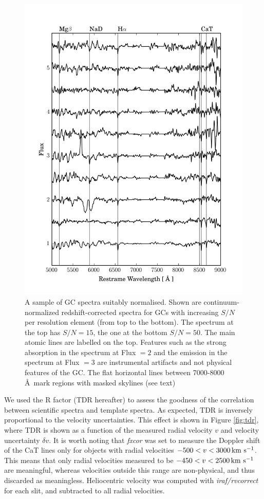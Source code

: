 \documentclass[useAMS,usenatbib]{mn2e}
\newcommand{\kms}{\mbox{\,km~s$^{-1}$}}
\begin{document}
\begin{figure}
\centering
\includegraphics[width=\columnwidth]{figures/vstack_spectra.png} 
\caption{A sample of GC spectra suitably normalised. Shown are 
continuum-normalized redshift-corrected spectra for GCs with increasing $S/N$ per resolution element
(from top to the bottom). The spectrum at the top has $S/N = 15$, 
the one at the bottom $S/N = 50$. The main atomic lines are labelled on the top. Features 
such as the strong absorption in the spectrum at Flux $= 2$ and the emission in 
the spectrum at Flux $=3$ are instrumental artifacts and not physical features 
of the GC. The flat horizontal lines between 7000-8000 \AA\ mark regions with 
masked skylines (see text)}
\label{fig:spectra}
\end{figure}

We used the \citet{Tonry79} R factor (TDR hereafter) to assess the goodness of 
the correlation between scientific spectra and template spectra. As expected, 
TDR is inversely proportional to the velocity uncertainties. This effect is 
shown in Figure \ref{fig:tdr}, where TDR is shown as a function of the measured 
radial velocity $v$ and velocity uncertainty $\delta v$. 
It is worth noting that {\it fxcor} was set to measure the Doppler shift of the 
CaT lines only for objects with radial velocities $-500 < v < 3000 \kms$. This 
means that only radial velocities measured to be $-450 < v < 2500 \kms$ are 
meaningful, whereas velocities outside this range are non-physical, and thus 
discarded as meaningless. Heliocentric velocity was computed with {\it iraf/rvcorrect} 
for each slit, and subtracted to all radial velocities. 
\end{document}
